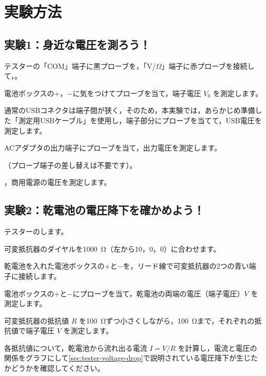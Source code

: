 \section{実験方法}

\subsection{実験1：身近な電圧を測ろう！}

\begin{procedure}[label=\textbf{1-\arabic*}, ref=1-\arabic*, leftmargin=*, labelsep=0.8em]
  \item テスターの「COM」端子に黒プローブを，「V/$\Omega$」端子に赤プローブを接続して，。
  \item {}電池ボックスの$+$，$-$に気をつけてプローブを当て，端子電圧 $V_0$ を測定します。
  \item {}通常のUSBコネクタは端子間が狭く，そのため，本実験では，あらかじめ準備した「測定用USBケーブル」を使用し，端子部分にプローブを当てて，USB電圧を測定します。
  \item {}ACアダプタの出力端子にプローブを当て，出力電圧を測定します。
  \item {}（プローブ端子の差し替えは不要です）。
  \item {}，商用電源の電圧を測定します。
\end{procedure}

\subsection{実験2：乾電池の電圧降下を確かめよう！}

\begin{procedure}[label=\textbf{2-\arabic*}, ref=2-\arabic*, leftmargin=*, labelsep=0.8em]
  \item テスターのします。
  \item 可変抵抗器のダイヤルを\SI{1000}{\ohm}（左から10，0，0）に合わせます。
  \item 乾電池を入れた電池ボックスの$+$と$-$を，リード線で可変抵抗器の2つの青い端子に接続します。
  \item 電池ボックスの$+$と$-$にプローブを当て，乾電池の両端の電圧（端子電圧）$V$ を測定します。
  \item 可変抵抗器の抵抗値 $R$ を\SI{100}{\ohm}ずつ小さくしながら，\SI{100}{\ohm}まで，それぞれの抵抗値で端子電圧 $V$ を測定します。
  \item 各抵抗値について，乾電池から流れ出る電流 $I=V/R$ を計算し，電流と電圧の関係をグラフにして\cref{sec:tester-voltage-drop}で説明されている電圧降下が生じたかどうかを確認してください。
\end{procedure}



